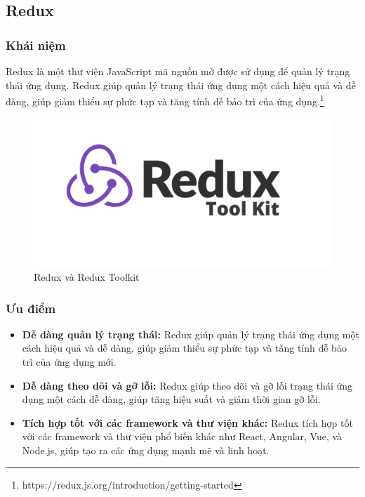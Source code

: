 \subsection{Redux}
\subsubsection{Khái niệm}
\noindent Redux là một thư viện JavaScript mã nguồn mở được sử dụng để quản lý trạng thái ứng dụng. Redux giúp quản lý trạng thái ứng dụng một cách hiệu quả và dễ dàng, giúp giảm thiểu sự phức tạp và tăng tính dễ bảo trì của ứng dụng.\footnote{https://redux.js.org/introduction/getting-started}
\begin{figure}[H]
  \begin{center}
    \includegraphics[scale=0.3]{images/hieu/phuluc/redux.png}
    \caption{Redux và Redux Toolkit}
  \end{center}
\end{figure}

\subsubsection{Ưu điểm}
\begin{itemize}
  \item \textbf{Dễ dàng quản lý trạng thái:} Redux giúp quản lý trạng thái ứng dụng một cách hiệu quả và dễ dàng, giúp giảm thiểu sự phức tạp và tăng tính dễ bảo trì của ứng dụng mới.
  \item \textbf{Dễ dàng theo dõi và gỡ lỗi:} Redux giúp theo dõi và gỡ lỗi trạng thái ứng dụng một cách dễ dàng, giúp tăng hiệu suất và giảm thời gian gỡ lỗi.
  \item \textbf{Tích hợp tốt với các framework và thư viện khác:} Redux tích hợp tốt với các framework và thư viện phổ biến khác như React, Angular, Vue, và Node.js, giúp tạo ra các ứng dụng mạnh mẽ và linh hoạt.  
\end{itemize}
